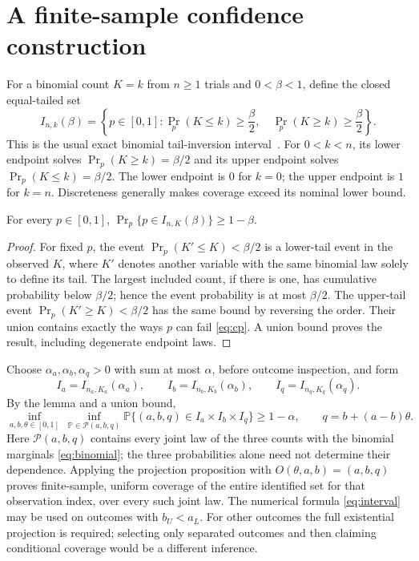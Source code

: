 \documentclass[11pt]{article}
\begin{document}
\section{A finite-sample confidence construction}

For a binomial count $K=k$ from $n\ge1$ trials and $0<\beta<1$, define the closed equal-tailed set
\begin{equation}
 I_{n,k}(\beta)=\left\{p\in[0,1]:
    \Pr_p(K\le k)\ge\frac\beta2,
    \quad\Pr_p(K\ge k)\ge\frac\beta2\right\}.
 \label{eq:cp}
\end{equation}
This is the usual exact binomial tail-inversion interval~\cite{nist}. For $0<k<n$, its lower endpoint solves $\Pr_p(K\ge k)=\beta/2$ and its upper endpoint solves $\Pr_p(K\le k)=\beta/2$. The lower endpoint is $0$ for $k=0$; the upper endpoint is $1$ for $k=n$. Discreteness generally makes coverage exceed its nominal lower bound.

\begin{lemma}
For every $p\in[0,1]$, $\Pr_p\{p\in I_{n,K}(\beta)\}\ge1-\beta$.
\end{lemma}
\begin{proof}
For fixed $p$, the event $\Pr_p(K'\le K)<\beta/2$ is a lower-tail event in the observed $K$, where $K'$ denotes another variable with the same binomial law solely to define its tail. The largest included count, if there is one, has cumulative probability below $\beta/2$; hence the event probability is at most $\beta/2$. The upper-tail event $\Pr_p(K'\ge K)<\beta/2$ has the same bound by reversing the order. Their union contains exactly the ways $p$ can fail \eqref{eq:cp}. A union bound proves the result, including degenerate endpoint laws.
\end{proof}

Choose $\alpha_a,\alpha_b,\alpha_q>0$ with sum at most $\alpha$, before outcome inspection, and form
\[
 I_a=I_{n_a,K_a}(\alpha_a),\qquad
 I_b=I_{n_b,K_b}(\alpha_b),\qquad
 I_q=I_{n_q,K_q}(\alpha_q).
\]
By the lemma and a union bound,
\[
 \inf_{a,b,\theta\in[0,1]}\ \inf_{\mathbb P\in\mathcal P(a,b,q)}
 \mathbb P\{(a,b,q)\in I_a\times I_b\times I_q\}\ge1-\alpha,
 \qquad q=b+(a-b)\theta.
\]
Here $\mathcal P(a,b,q)$ contains every joint law of the three counts with the binomial marginals \eqref{eq:binomial}; the three probabilities alone need not determine their dependence. Applying the projection proposition with $O(\theta,a,b)=(a,b,q)$ proves finite-sample, uniform coverage of the entire identified set for that observation index, over every such joint law. The numerical formula \eqref{eq:interval} may be used on outcomes with $b_U<a_L$. For other outcomes the full existential projection is required; selecting only separated outcomes and then claiming conditional coverage would be a different inference.
\end{document}
